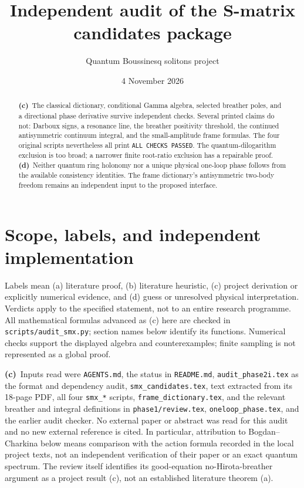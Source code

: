 \documentclass[11pt,a4paper]{article}
\title{Independent audit of the S-matrix candidates package}
\author{Quantum Boussinesq solitons project}
\date{4 November 2026}
\newcommand{\Lc}{\textbf{(c)}\ }
\newcommand{\Ld}{\textbf{(d)}\ }
\newcommand{\scr}{\texttt{audit\_smx.py}}
\begin{document}
\maketitle
\begin{abstract}
\Lc The classical dictionary, conditional Gamma algebra, selected breather poles,
and a directional phase derivative survive independent checks. Several printed
claims do not: Darboux signs, a resonance line, the breather positivity threshold,
the continued antisymmetric continuum integral, and the small-amplitude frame
formulas. The four original scripts nevertheless all print
\texttt{ALL CHECKS PASSED}. The quantum-dilogarithm exclusion is too broad;
a narrower finite root-ratio exclusion has a repairable proof.
\Ld Neither quantum ring holonomy nor a unique physical one-loop phase follows
from the available consistency identities. The frame dictionary's antisymmetric
two-body freedom remains an independent input to the proposed interface.
\end{abstract}

\section{Scope, labels, and independent implementation}
Labels mean (a) literature proof, (b) literature heuristic, (c) project
derivation or explicitly numerical evidence, and (d) guess or unresolved
physical interpretation. Verdicts apply to the specified statement, not to
an entire research programme. All mathematical formulas advanced as (c) here
are checked in \texttt{scripts/}\scr; section names below identify its functions.
Numerical checks support the displayed algebra and counterexamples; finite
sampling is not represented as a global proof.

\Lc Inputs read were \texttt{AGENTS.md}, the status in \texttt{README.md},
\texttt{audit\_phase2i.tex} as the format and dependency audit,
\texttt{smx\_candidates.tex}, text extracted from its 18-page PDF, all four
\texttt{smx\_*} scripts, \texttt{frame\_dictionary.tex}, and the relevant
breather and integral definitions in \texttt{phase1/review.tex},
\texttt{oneloop\_phase.tex}, and the earlier audit checker.
No external paper or abstract was read for this audit and no new external
reference is cited. In particular, attribution to Bogdan--Charkina below means
comparison with the action formula recorded in the local project texts,
not an independent verification of their paper or an exact quantum spectrum.
The review itself identifies its good-equation no-Hirota-breather argument
as a project result (c), not an established literature theorem (a).
\end{document}
